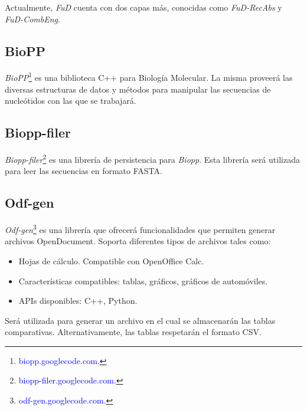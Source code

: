 \documentclass[12pt,a4paper,spanish]{article}
\begin{document}
		\par Actualmente, \emph{FuD} cuenta con dos capas más, conocidas como 
		\emph{FuD-RecAbs} y \emph{FuD-CombEng}.

	\subsection{BioPP}
		\par \textit{BioPP}\footnote{\textcolor{blue}{biopp.googlecode.com.}} es una biblioteca C++ para Biología 			Molecular. La misma proveerá las diversas estructuras de datos y métodos para manipular las secuencias de 			nucleótidos con las que se trabajará. 

	\subsection{Biopp-filer}
		 \par \textit{Biopp-filer}\footnote{\textcolor{blue}{biopp-filer.googlecode.com.}} es una librería de persistencia 			 para \emph{Biopp}. Esta librería será utilizada para leer las secuencias en formato FASTA.  

	\subsection{Odf-gen}
		\textit{Odf-gen}\footnote{\textcolor{blue}{odf-gen.googlecode.com.}} es una librería que ofrecerá funcionalidades 			que permiten generar archivos OpenDocument. Soporta diferentes tipos de archivos tales como:
		\begin{itemize}
			\item Hojas de cálculo. Compatible con OpenOffice Calc.
			\item Características compatibles: tablas, gráficos, gráficos de automóviles.
			\item APIs disponibles: C++, Python.
		\end{itemize}
		 \par Será utilizada para generar un archivo en el cual se almacenarán las tablas comparativas.	Alternativamente, 			las tablas respetarán el formato \textsf{CSV}.
		 
\end{document}
